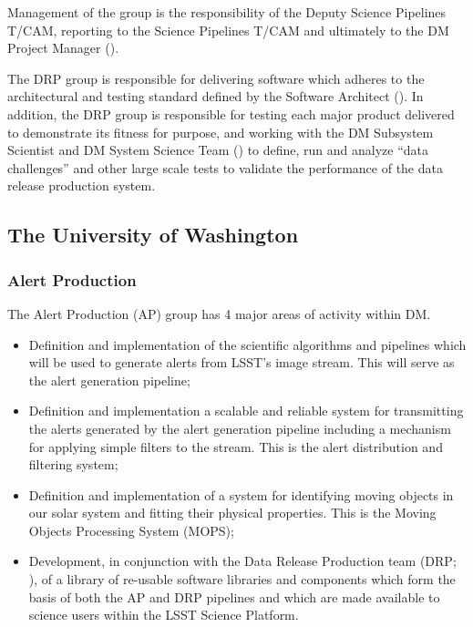 Management of the group is the responsibility of the Deputy \gls{Science Pipelines} \gls{T/CAM}, reporting to the \gls{Science Pipelines} \gls{T/CAM} and ultimately to the \gls{DM} \gls{Project Manager} ().

The \gls{DRP} group is responsible for delivering software which adheres to the architectural and testing standard defined by the Software Architect ().
In addition, the \gls{DRP} group is responsible for testing each major product delivered to demonstrate its fitness for purpose, and working with the \gls{DM} \gls{Subsystem Scientist} and \gls{DM} System Science Team () to define, run and analyze ``data challenges'' and other large scale tests to validate the performance of the data release production system.

\subsection {The University of Washington\label{sect:uw}}

\subsubsection{Alert Production\label{sect:ap}}

The \gls{Alert Production} (\gls{AP}) group has 4 major areas of activity within \gls{DM}.

\begin{itemize}

  \item{Definition and implementation of the scientific algorithms and pipelines which will be used to generate alerts from \gls{LSST}'s image stream.  This will serve as the alert generation \gls{pipeline};}

  \item{Definition and implementation a scalable and reliable system for transmitting the alerts generated by the alert generation \gls{pipeline} including a mechanism for applying simple filters to the stream. This is the alert distribution and filtering system;}

  \item{Definition and implementation of a system for identifying moving objects in our solar system and fitting their physical properties. This is the Moving Objects Processing System (\gls{MOPS});}

  \item{Development, in conjunction with the Data \gls{Release} Production team (\gls{DRP}; ), of a library of re-usable software libraries and components which form the basis of both the \gls{AP} and \gls{DRP} pipelines and which are made available to science users within the \gls{LSST} \gls{Science Platform}.}

\end{itemize}

